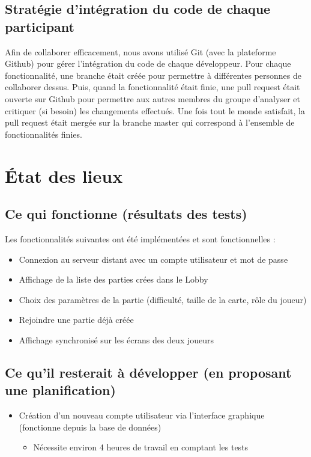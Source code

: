 \documentclass[a4paper,12pt]{article}
\begin{document}
	
	\subsection{Stratégie d'intégration du code de chaque participant}
	Afin de collaborer efficacement, nous avons utilisé Git (avec la plateforme Github) pour gérer l'intégration du code de chaque développeur. Pour chaque fonctionnalité, une branche était créée pour permettre à différentes personnes de collaborer dessus. Puis, quand la fonctionnalité était finie, une pull request était ouverte sur Github pour permettre aux autres membres du groupe d'analyser et critiquer (si besoin) les changements effectués. Une fois tout le monde satisfait, la pull request était mergée sur la branche master qui correspond à l'ensemble de fonctionnalités finies.
	
	\section{État des lieux}
	
	
	\subsection{Ce qui fonctionne (résultats des tests)}
	Les fonctionnalités suivantes ont été implémentées et sont fonctionnelles :
	\begin{itemize}
		\item Connexion au serveur distant avec un compte utilisateur et mot de passe
		\item Affichage de la liste des parties crées dans le Lobby
		\item Choix des paramètres de la partie (difficulté, taille de la carte, rôle du joueur)
		\item Rejoindre une partie déjà créée
		\item Affichage synchronisé sur les écrans des deux joueurs
	\end{itemize}	
	
	\subsection{Ce qu'il resterait à développer (en proposant une planification)}
	
	\begin{itemize}
		\item Création d'un nouveau compte utilisateur via l'interface graphique (fonctionne depuis la base de données)
		\begin{itemize}
			\item Nécessite environ 4 heures de travail en comptant les tests
		\end{itemize}
		
	\end{itemize}
	
\end{document}
